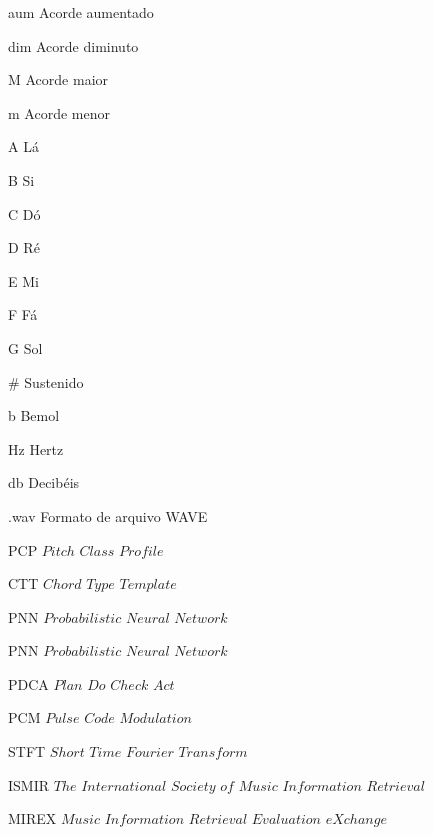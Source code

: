 \begin{siglas}
  \item[aum] Acorde aumentado
  \item[dim] Acorde diminuto
  \item[M] Acorde maior
  \item[m] Acorde menor
  \item[A] Lá
  \item[B] Si
  \item[C] Dó
  \item[D] Ré
  \item[E] Mi
  \item[F] Fá
  \item[G] Sol
  \item[\#] Sustenido
  \item[b] Bemol
  \item[Hz] Hertz
  \item[db] Decibéis
  \item[.wav] Formato de arquivo WAVE
  \item[PCP] $Pitch$ $Class$ $Profile$
  \item[CTT] $Chord$ $Type$ $Template$
  \item[PNN] $Probabilistic$ $Neural$ $Network$
  \item[PNN] $Probabilistic$ $Neural$ $Network$
  \item[PDCA] $Plan$ $Do$ $Check$ $Act$
  \item[PCM] $Pulse$ $Code$ $Modulation$
  \item[STFT] $Short$ $Time$ $Fourier$ $Transform$
  \item[ISMIR] $The$ $International$ $Society$ $of$ $Music$ $Information$ $Retrieval$
  \item[MIREX] $Music$ $Information$ $Retrieval$ $Evaluation$ $eXchange$

\end{siglas}
